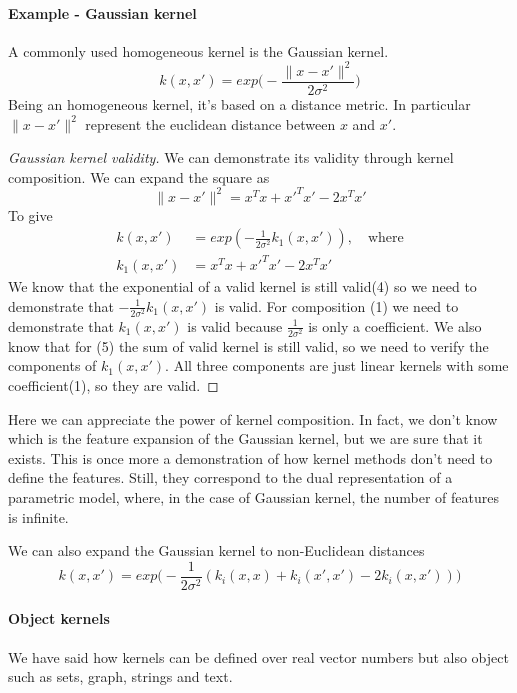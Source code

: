\documentclass[../main.tex]{subfiles}
\begin{document}
\paragraph{Example - Gaussian kernel} A commonly used homogeneous kernel is the Gaussian kernel.
\begin{equation}
    k(x,x') = exp \bigg(-\frac{\|x-x'\|^2}{2\sigma^2} \bigg)
\end{equation}
Being an homogeneous kernel, it's based on a distance metric. In particular $\|x-x'\|^2$ represent the euclidean distance between $x$ and $x'$.
\begin{proof}[Gaussian kernel validity]
    We can demonstrate its validity through kernel composition.
    We can expand the square as
    \begin{equation*}
        \|x-x'\|^2 = x^Tx + x'^Tx' -2x^Tx'
    \end{equation*}
    To give
    \begin{align*}
        k(x,x')   & = exp(-\frac{1}{2\sigma^2} k_1(x,x')), \quad \text{where} \\
        k_1(x,x') & = x^Tx + x'^Tx' - 2x^Tx'
    \end{align*}
    We know that the exponential of a valid kernel is still valid(4) so we need to demonstrate that $-\frac{1}{2\sigma^2}k_1(x,x')$ is valid.
    For composition (1) we need to demonstrate that $k_1(x,x')$ is valid because $\frac{1}{2\sigma^2}$ is only a coefficient. We also know that for (5) the sum of valid kernel is still valid, so we need to verify the components of $k_1(x,x')$. All three components are just linear kernels with some coefficient(1), so they are valid.
\end{proof}
Here we can appreciate the power of kernel composition. In fact, we don't know which is the feature expansion of the Gaussian kernel, but we are sure that it exists. This is once more a demonstration of how kernel methods don't need to define the features. Still, they correspond to the dual representation of a parametric model, where, in the case of Gaussian kernel, the number of features is infinite.

We can also expand the Gaussian kernel to non-Euclidean distances
\begin{equation}
    k(x,x') = exp\bigg( -\frac{1}{2\sigma^2}(k_i(x,x) + k_i(x',x') - 2k_i(x,x'))  \bigg)
\end{equation}

\paragraph{Object kernels}
We have said how kernels can be defined over real vector numbers but also object such as sets, graph, strings and text.
\end{document}
